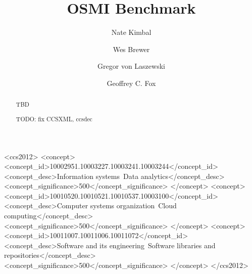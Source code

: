 \documentclass[sigplan,screen,review]{acmart}
\begin{document}
\title{OSMI Benchmark}


\author{Nate Kimbal}

\author{Wes Brewer}

\author{Gregor von Laszewski}

\author{Geoffrey C. Fox}



\begin{abstract}
  TBD

  TODO: fix CCSXML, ccsdec
\end{abstract}

\begin{CCSXML}
<ccs2012>
   <concept>
       <concept_id>10002951.10003227.10003241.10003244</concept_id>
       <concept_desc>Information systems~Data analytics</concept_desc>
       <concept_significance>500</concept_significance>
       </concept>
   <concept>
       <concept_id>10010520.10010521.10010537.10003100</concept_id>
       <concept_desc>Computer systems organization~Cloud computing</concept_desc>
       <concept_significance>500</concept_significance>
       </concept>
   <concept>
       <concept_id>10011007.10011006.10011072</concept_id>
       <concept_desc>Software and its engineering~Software libraries and repositories</concept_desc>
       <concept_significance>500</concept_significance>
       </concept>
 </ccs2012>
\end{CCSXML}
\end{document}
